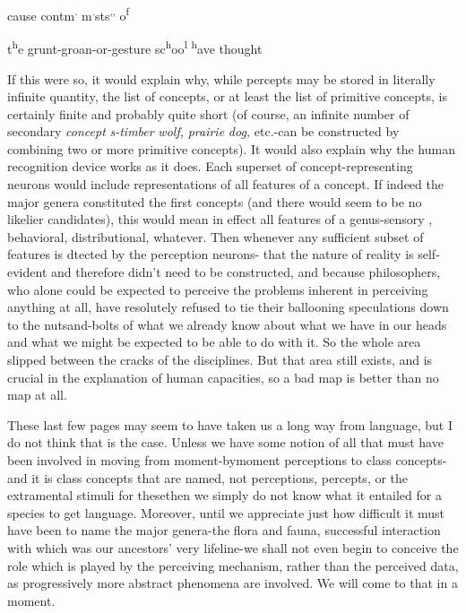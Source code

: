 cause
\textsuperscript{{\textquotedbl}}contm\textsuperscript{.} m\textsuperscript{.}sts\textsuperscript{,,} o\textsuperscript{f}

t\textsuperscript{h}e grunt-groan-or-gesture sc\textsuperscript{h}oo\textsuperscript{l} \textsuperscript{h}ave thought

If this were so, it would explain why, while percepts may be stored in literally infinite quantity, the list of concepts, or at least the list of primitive concepts, is certainly finite and probably quite short (of course, an infinite number of secondary \textit{concept} \textit{s-timber} \textit{wolf,} \textit{prairie} \textit{dog,} etc.-can be constructed by combining two or more primitive concepts). It would also explain why the human recognition device works as it does. Each superset of concept-representing neurons would include representations of all features of a concept. If indeed the major genera constituted the first concepts (and there would seem to be no likelier candidates), this would mean in effect all features of a genus-sensory , behavioral, distributional, whatever. Then whenever any sufficient subset of features is dtected by the perception neurons-
that the nature of reality is self-evident and therefore didn't need to be constructed, and because philosophers, who alone could be expected to perceive the problems inherent in perceiving anything at all, have resolutely refused to tie their ballooning speculations down to the nuts\-and-bolts of what we already know about what we have in our heads and what we might be expected to be able to do with it. So the whole area slipped between the cracks of the disciplines. But that area still exists, and is crucial in the explanation of human capacities, so a bad map is better than no map at all.

These last few pages may seem to have taken us a long way from language, but I do not think that is the case. Unless we have some
notion of all that must have been involved in moving from moment-by\-moment perceptions to class concepts-and it is class concepts that are named, not perceptions, percepts, or the extramental stimuli for these\-then we simply do not know what it entailed for a species to get language. Moreover, until we appreciate just how difficult it must have been to name the major genera-the flora and fauna, successful inter\-action with which was our ancestors' very lifeline-we shall not even begin to conceive the role which is played by the perceiving mechan\-ism, rather than the perceived data, as progressively more abstract phenomena are involved. We will come to that in a moment.

